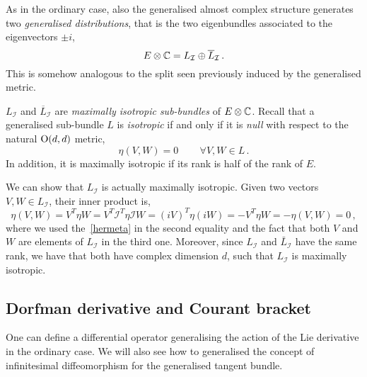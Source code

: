 \documentclass[debug]{phd}
\begin{document}
						As in the ordinary case, also the generalised almost complex structure generates two \emph{generalised distributions}, that is the two eigenbundles associated to the eigenvectors $\pm i$,
								\begin{equation}
									E \otimes \mathbb{C} = L_\mathcal{I} \oplus \overline{L}_\mathcal{I} \, .
								\end{equation}
						This is somehow analogous to the split seen previously induced by the generalised metric.
						
						$L_\mathcal{I}$ and $\overline{L}_\mathcal{I}$ are \emph{maximally isotropic sub-bundles} of $E\otimes \mathbb{C}$.
						Recall that a generalised sub-bundle $L$ is \emph{isotropic} if and only if it is \emph{null} with respect to the natural $\mathrm{O}(d,d)$ metric,
								\begin{equation}
									\eta(V,W) = 0 \, \qquad \forall V, W \in L \, .
								\end{equation}
						In addition, it is maximally isotropic if its rank is half of the rank of $E$.
						
						We can show that $L_\mathcal{I}$ is actually maximally isotropic.
						Given two vectors $V, W \in L_\mathcal{I}$, their inner product is,
								\begin{equation*}
									\eta(V,W) = V^T \eta W = V^T \mathcal{I}^T \eta \mathcal{I} W = (i V)^T \eta (iW) = - V^T \eta W = - \eta (V,W) = 0 \, ,
								\end{equation*}
						where we used the~\eqref{hermeta} in the second equality and the fact that both $V$ and $W$ are elements of $L_{\mathcal{I}}$ in the third one.
						Moreover, since $L_\mathcal{I}$ and $\bar{L}_\mathcal{I}$ have the same rank, we have that both have complex dimension $d$, such that $L_\mathcal{I}$ is maximally isotropic.
			\subsection{Dorfman derivative and Courant bracket}
					One can define a differential operator generalising the action of the Lie derivative in the ordinary case.
					We will also see how to generalised the concept of infinitesimal diffeomorphism for the generalised tangent bundle.
					
\end{document}
